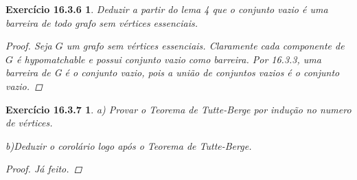 \documentclass[a4paper,12pt]{article}
\newtheorem*{12}{Exercício 16.3.6}
\newtheorem*{13}{Exercício 16.3.7}
\begin{document}
\begin{12}

Deduzir a partir do lema 4 que o conjunto vazio é uma barreira de todo grafo sem vértices essenciais.

\begin{proof}

Seja $G$ um grafo sem vértices essenciais. Claramente cada componente de $G$ é hypomatchable e possui conjunto vazio como barreira. Por 16.3.3, uma barreira de G é o conjunto vazio, pois a união de conjuntos vazios é o conjunto vazio.

\end{proof}

\end{12}

\begin{13}

a) Provar o Teorema de Tutte-Berge por indução no numero de vértices.

\noindent b)Deduzir o corolário logo após o Teorema de Tutte-Berge.

\begin{proof}

Já feito.

\end{proof}

\end{13}
\end{document}
